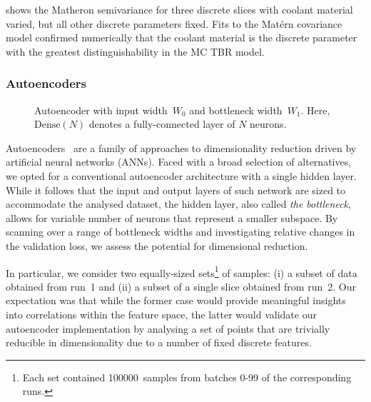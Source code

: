  shows the Matheron semivariance \cite{Matheron1963} for three discrete slices with coolant material varied, but all other discrete parameters fixed. Fits \cite{KrigingFig} to the Matérn covariance model confirmed numerically that the coolant material is the discrete parameter with the greatest distinguishability in the MC TBR model. 


\subsubsection{Autoencoders}

\begin{figure}
	\centering
	\vspace{-5ex}
	{\footnotesize {}}
	\caption{Autoencoder with input width~$W_0$ and bottleneck width~$W_1$.
	Here, $\text{Dense}(N)$ denotes a fully-connected layer of $N$ neurons.}
	\label{fig:autoencoder}
	\vspace{-9ex}
\end{figure}

Autoencoders~\cite{SCHMIDHUBER201585} are a family of approaches to
dimensionality reduction driven by artificial neural
networks (ANNs). Faced with a broad selection of alternatives, we opted for a
conventional autoencoder architecture with a single hidden layer. While it
follows that the input and output layers of such
network are sized to accommodate the analysed dataset, the
hidden layer, also called \textit{the bottleneck}, allows for variable number of
neurons that represent a smaller subspace. By scanning
over a range of bottleneck widths and investigating relative changes in the
validation loss, we assess the potential for dimensional reduction.

In particular, we consider two equally-sized sets\footnote{Each set contained
\num{100000}~samples from batches 0-99 of the corresponding runs.} of samples: (i) a subset of data obtained
from run~1 and (ii) a subset of a single slice obtained from run~2. Our
expectation was that while the former case would provide meaningful insights into
correlations within the feature space, the latter would validate our
autoencoder implementation by analysing a set of points that are trivially
reducible in dimensionality due to a number of fixed discrete features.

